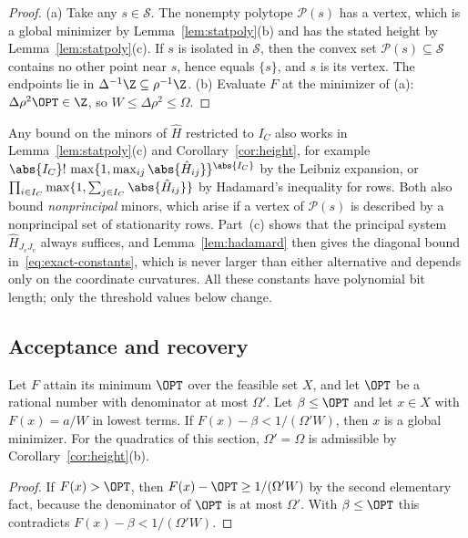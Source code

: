 \begin{proof}
(a) Take any $s\in\mathcal S$. The nonempty polytope $\mathcal P(s)$ has a
vertex, which is a global minimizer by Lemma~\ref{lem:statpoly}(b) and has
the stated height by Lemma~\ref{lem:statpoly}(c). If $s$ is isolated in
$\mathcal S$, then the convex set $\mathcal P(s)\subseteq\mathcal S$ contains
no other point near $s$, hence equals $\{s\}$, and $s$ is its vertex. The
endpoints lie in $\Delta^{-1}\Z\subseteq\rho^{-1}\Z$.
(b) Evaluate $F$ at the minimizer of (a): $\Delta\rho^2\OPT\in\Z$, so
$W\le \Delta\rho^2\le \Omega$.
\end{proof}

\begin{remark}\label{rem:heights}
Any bound on the minors of $\hat H$ restricted to $I_C$ also works in
Lemma~\ref{lem:statpoly}(c) and Corollary~\ref{cor:height}, for example
$\abs{I_C}!\,\max\{1,\max_{ij}\abs{\hat H_{ij}}\}^{\abs{I_C}}$ by the Leibniz
expansion, or $\prod_{i\in I_C}\max\{1,\sum_{j\in I_C}\abs{\hat H_{ij}}\}$ by
Hadamard's inequality for rows. Both also bound \emph{nonprincipal} minors,
which arise if a vertex of $\mathcal P(s)$ is described by a nonprincipal set
of stationarity rows. Part~(c) shows that the principal system
$\hat H_{J_vJ_v}$ always suffices, and Lemma~\ref{lem:hadamard} then gives the
diagonal bound in~\eqref{eq:exact-constants}, which is never larger than
either alternative and depends only on the coordinate curvatures. All these
constants have polynomial bit length; only the threshold values below
change.
\end{remark}

\subsection{Acceptance and recovery}\label{sec:exact-accept}

\begin{proposition}\label{prop:accept}
Let $F$ attain its minimum $\OPT$ over the feasible set $X$, and let $\OPT$ be
a rational number with denominator at most $\Omega'$. Let $\beta\le\OPT$ and
let $x\in X$ with $F(x)=a/W$ in lowest terms. If
$F(x)-\beta<1/(\Omega'W)$, then $x$ is a global minimizer. For the quadratics
of this section, $\Omega'=\Omega$ is admissible by
Corollary~\ref{cor:height}(b).
\end{proposition}

\begin{proof}
If $F(x)>\OPT$, then $F(x)-\OPT\ge1/(\Omega'W)$ by the second elementary
fact, because the denominator of $\OPT$ is at most $\Omega'$. With
$\beta\le\OPT$ this contradicts $F(x)-\beta<1/(\Omega'W)$.
\end{proof}

